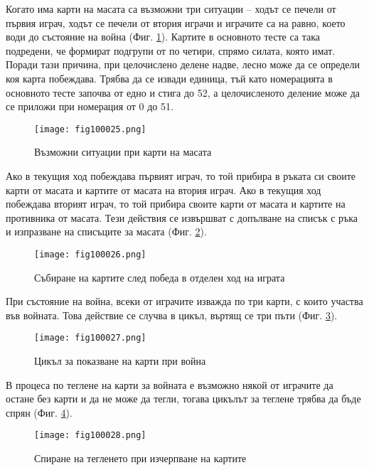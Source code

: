 Когато има карти на масата са възможни три ситуации – ходът се печели от първия играч, ходът се печели от втория играчи и играчите са на равно, което води до състояние на война (Фиг. \ref{fig100025}). Картите в основното тесте са така подредени, че формират подгрупи от по четири, спрямо силата, която имат. Поради тази причина, при целочислено делене надве, лесно може да се определи коя карта побеждава. Трябва да се извади единица, тъй като номерацията в основното тесте започва от едно и стига до 52, а целочисленото деление може да се приложи при номерация от 0 до 51. 

\begin{figure}[H]
  \centering
  \texttt{[image: fig100025.png]}
  \caption{Възможни ситуации при карти на масата}
\label{fig100025}
\end{figure}

Ако в текущия ход побеждава първият играч, то той прибира в ръката си своите карти от масата и картите от масата на втория играч. Ако в текущия ход побеждава вторият играч, то той прибира своите карти от масата и картите на противника от масата. Тези действия се извършват с допълване на списък с ръка и изпразване на списъците за масата (Фиг. \ref{fig100026}).

\begin{figure}[H]
  \centering
  \texttt{[image: fig100026.png]}
  \caption{Събиране на картите след победа в отделен ход на играта}
\label{fig100026}
\end{figure}

При състояние на война, всеки от играчите изважда по три карти, с които участва във войната. Това действие се случва в цикъл, въртящ се три пъти (Фиг. \ref{fig100027}).

\begin{figure}[H]
  \centering
  \texttt{[image: fig100027.png]}
  \caption{Цикъл за показване на карти при война}
\label{fig100027}
\end{figure}

В процеса по теглене на карти за войната е възможно някой от играчите да остане без карти и да не може да тегли, тогава цикълът за теглене трябва да бъде спрян (Фиг. \ref{fig100028}).

\begin{figure}[H]
  \centering
  \texttt{[image: fig100028.png]}
  \caption{Спиране на тегленето при изчерпване на картите}
\label{fig100028}
\end{figure}

